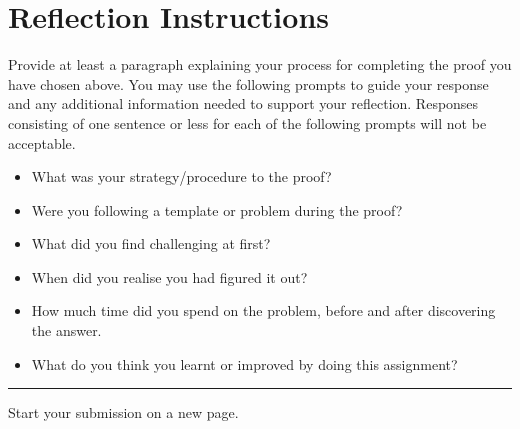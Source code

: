 \documentclass{article}
\theoremstyle{definition}
\newtheorem*{claim}{Claim} %
\newtheorem*{reflection}{Reflection} %
\begin{document}
\vfill


\section*{Reflection Instructions}

Provide at least a paragraph explaining your process for completing the proof you have chosen above. You may use the following prompts to guide your response and any additional information needed to support your reflection. Responses consisting of one sentence or less for each of the following prompts will not be acceptable.

\begin{itemize}
    \item What was your strategy/procedure to the proof?
    \item Were you following a template or problem during the proof?
    \item What did you find challenging at first?
    \item When did you realise you had figured it out?
    \item How much time did you spend on the problem, before and after discovering the answer.
    \item What do you think you learnt or improved by doing this assignment?
\end{itemize}


\vfill
\hrule\medskip
\noindent Start your submission on a new page.




\end{document}
